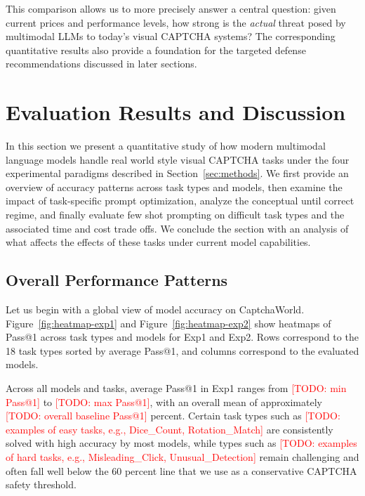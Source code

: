 \documentclass[sigconf, review]{acmart}
\begin{document}
This comparison allows us to more precisely answer a central question: given current prices and performance levels, how strong is the \emph{actual} threat posed by multimodal LLMs to today’s visual CAPTCHA systems? The corresponding quantitative results also provide a foundation for the targeted defense recommendations discussed in later sections.



\section{Evaluation Results and Discussion}

In this section we present a quantitative study of how modern multimodal language models handle real world style visual CAPTCHA tasks under the four experimental paradigms described in Section~\ref{sec:methods}. We first provide an overview of accuracy patterns across task types and models, then examine the impact of task-specific prompt optimization, analyze the conceptual until correct regime, and finally evaluate few shot prompting on difficult task types and the associated time and cost trade offs. We conclude the section with an analysis of what affects the effects of these tasks under current model capabilities.

\subsection{Overall Performance Patterns}

Let us begin with a global view of model accuracy on CaptchaWorld. Figure~\ref{fig:heatmap-exp1} and Figure~\ref{fig:heatmap-exp2} show heatmaps of Pass@1 across task types and models for Exp1 and Exp2. Rows correspond to the 18 task types sorted by average Pass@1, and columns correspond to the evaluated models.

Across all models and tasks, average Pass@1 in Exp1 ranges from \textcolor{red}{[TODO: min Pass@1]} to \textcolor{red}{[TODO: max Pass@1]}, with an overall mean of approximately \textcolor{red}{[TODO: overall baseline Pass@1]} percent. Certain task types such as \textcolor{red}{[TODO: examples of easy tasks, e.g., Dice\_Count, Rotation\_Match]} are consistently solved with high accuracy by most models, while types such as \textcolor{red}{[TODO: examples of hard tasks, e.g., Misleading\_Click, Unusual\_Detection]} remain challenging and often fall well below the 60 percent line that we use as a conservative CAPTCHA safety threshold.
\end{document}

